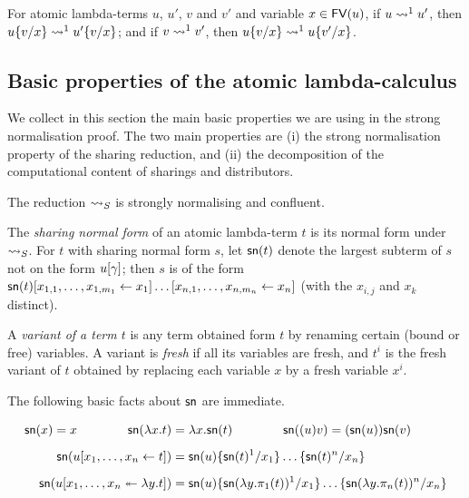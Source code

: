 \documentclass{llncs} %
\begin{document}
\begin{lemma}
For atomic lambda-terms $u$, $u'$, $v$ and $v'$ and variable $x \in {\mathop{\mathsf{FV}}}(u)$,
%
if $u \rewrite^1 u'$, then $u\sub xv \rewrite^1 u'\sub xv$; and
if $v\rewrite^1 v'$, then $u\sub xv \rewrite^1 u\sub x{v'}$.
\end{lemma}

\subsection{Basic properties of the atomic lambda-calculus}
\label{ssec:basic properties}

We collect in this section the main basic properties we are using in the strong normalisation proof. The two main properties are (i) the strong normalisation property of the sharing reduction, and (ii) the  decomposition of the computational content of sharings and distributors.

\begin{theorem}
The reduction $\ALnotbeta$ is strongly normalising and confluent.
\end{theorem}

\noindent
The \emph{sharing normal form} of an atomic lambda-term $t$ is its normal form under $\ALnotbeta$.
%
For $t$ with sharing normal form $s$, let ${\mathsf{sn}}(t)$ denote the largest subterm of $s$ not on the form $u\g$; then $s$ is of the form $\sn(t)\share*{x_{1,1},\dots,x_{1,m_1}}{x_1}\dots\share*{x_{n,1},\dots,x_{n,m_n}}{x_n}$ (with the $x_{i,j}$ and $x_k$ distinct).


A \emph{variant of a term $t$} is any term obtained form $t$ by
renaming certain (bound or free) variables.
%
A variant is \emph{fresh} if all its variables are fresh, and $t^i$ is the fresh variant of $t$ obtained by replacing each
variable $x$ by a fresh variable $x^i$.


The following basic facts about ${\mathsf{sn}}$ are immediate.

\begin{proposition}
\[
\begin{aligned}
	\sn(x) = x \quads4
	\sn(\lambda x.t) & =\lambda x.\sn(t) \quads4
	\sn((u)v) = (\sn(u))\sn(v)
\\[5pt]
   \sn(u\share xt) & =\sn(u)\sub{x_1}{\sn(t)^1}\dots\sub{x_n}{\sn(t)^n}
\\[5pt]
	\sn(u\distr xyt) &=\sn(u)\sub{x_1}{\sn(\lambda y.\pi_1(t))^1}\dots\sub{x_n}{\sn(\lambda y.\pi_n(t))^n}
\end{aligned}
\]
\end{proposition}
\end{document}
